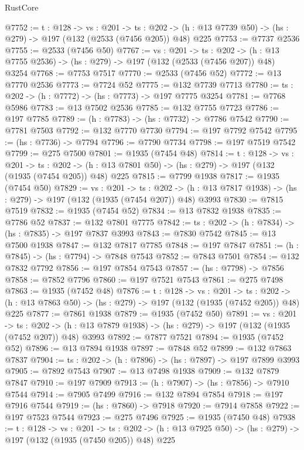 \begin{lexlean}{RustCore}
\begin{coremodule}
@7752 := {t : @128} ->
  {vs : @201} ->
  {ts : @202} -> (h : @13 @7739 @50) -> (hs : @279) -> @197 (@132 (@2533 (@7456 @205)) @48) @225
@7753 := @7737 @2536
@7755 := @2533 (@7456 @50)
@7767 := {vs : @201} ->
  {ts : @202} -> (h : @13 @7755 @2536) -> (hs : @279) -> @197 (@132 (@2533 (@7456 @207)) @48) @3254
@7768 := @7753 @7517
@7770 := @2533 (@7456 @52)
@7772 := @13 @7770 @2536
@7773 := @7724 @52
@7775 := @132 @7739 @7713
@7780 := {ts : @202} -> (h : @7772) -> (hs : @7773) -> @197 @7775 @3254
@7781 := @7768 @5986
@7783 := @13 @7502 @2536
@7785 := @132 @7755 @7723
@7786 := @197 @7785
@7789 := (h : @7783) -> (hs : @7732) -> @7786 @7542
@7790 := @7781 @7503
@7792 := @132 @7770 @7730
@7794 := @197 @7792 @7542
@7795 := (hs : @7736) -> @7794
@7796 := @7790 @7734
@7798 := @197 @7519 @7542
@7799 := @275 @7500
@7801 := @1935 (@7454 @48)
@7814 := {t : @128} ->
  {vs : @201} ->
  {ts : @202} -> (h : @13 @7801 @50) -> (hs : @279) -> @197 (@132 (@1935 (@7454 @205)) @48) @225
@7815 := @7799 @1938
@7817 := @1935 (@7454 @50)
@7829 := {vs : @201} ->
  {ts : @202} -> (h : @13 @7817 @1938) -> (hs : @279) -> @197 (@132 (@1935 (@7454 @207)) @48) @3993
@7830 := @7815 @7519
@7832 := @1935 (@7454 @52)
@7834 := @13 @7832 @1938
@7835 := @7786 @52
@7837 := @132 @7801 @7775
@7842 := {ts : @202} -> (h : @7834) -> (hs : @7835) -> @197 @7837 @3993
@7843 := @7830 @7542
@7845 := @13 @7500 @1938
@7847 := @132 @7817 @7785
@7848 := @197 @7847
@7851 := (h : @7845) -> (hs : @7794) -> @7848 @7543
@7852 := @7843 @7501
@7854 := @132 @7832 @7792
@7856 := @197 @7854 @7543
@7857 := (hs : @7798) -> @7856
@7858 := @7852 @7796
@7860 := @197 @7521 @7543
@7861 := @275 @7498
@7863 := @1935 (@7452 @48)
@7876 := {t : @128} ->
  {vs : @201} ->
  {ts : @202} -> (h : @13 @7863 @50) -> (hs : @279) -> @197 (@132 (@1935 (@7452 @205)) @48) @225
@7877 := @7861 @1938
@7879 := @1935 (@7452 @50)
@7891 := {vs : @201} ->
  {ts : @202} -> (h : @13 @7879 @1938) -> (hs : @279) -> @197 (@132 (@1935 (@7452 @207)) @48) @3993
@7892 := @7877 @7521
@7894 := @1935 (@7452 @52)
@7896 := @13 @7894 @1938
@7897 := @7848 @52
@7899 := @132 @7863 @7837
@7904 := {ts : @202} -> (h : @7896) -> (hs : @7897) -> @197 @7899 @3993
@7905 := @7892 @7543
@7907 := @13 @7498 @1938
@7909 := @132 @7879 @7847
@7910 := @197 @7909
@7913 := (h : @7907) -> (hs : @7856) -> @7910 @7544
@7914 := @7905 @7499
@7916 := @132 @7894 @7854
@7918 := @197 @7916 @7544
@7919 := (hs : @7860) -> @7918
@7920 := @7914 @7858
@7922 := @197 @7523 @7544
@7923 := @275 @7496
@7925 := @1935 (@7450 @48)
@7938 := {t : @128} ->
  {vs : @201} ->
  {ts : @202} -> (h : @13 @7925 @50) -> (hs : @279) -> @197 (@132 (@1935 (@7450 @205)) @48) @225

\end{coremodule}
\end{lexlean}
